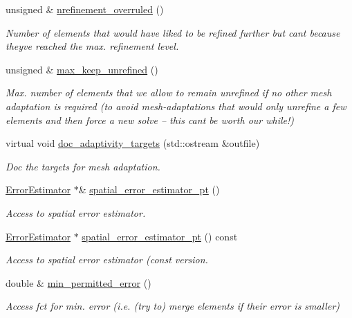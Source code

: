 \begin{DoxyCompactItemize}
unsigned \& \hyperlink{classoomph_1_1RefineableMeshBase_af189058782c7217f6d29a6f9555e7c3d}{nrefinement\+\_\+overruled} ()
\begin{DoxyCompactList}\small\item\em Number of elements that would have liked to be refined further but can\textquotesingle{}t because they\textquotesingle{}ve reached the max. refinement level. \end{DoxyCompactList}\item 
unsigned \& \hyperlink{classoomph_1_1RefineableMeshBase_a2216b4d0a8433a1975e6990a5e6533f7}{max\+\_\+keep\+\_\+unrefined} ()
\begin{DoxyCompactList}\small\item\em Max. number of elements that we allow to remain unrefined if no other mesh adaptation is required (to avoid mesh-\/adaptations that would only unrefine a few elements and then force a new solve -- this can\textquotesingle{}t be worth our while!) \end{DoxyCompactList}\item 
virtual void \hyperlink{classoomph_1_1RefineableMeshBase_a9f54bbde6fbfe2fef719c4d3fa5e0ae7}{doc\+\_\+adaptivity\+\_\+targets} (std\+::ostream \&outfile)
\begin{DoxyCompactList}\small\item\em Doc the targets for mesh adaptation. \end{DoxyCompactList}\item 
\hyperlink{classoomph_1_1ErrorEstimator}{Error\+Estimator} $\ast$\& \hyperlink{classoomph_1_1RefineableMeshBase_af8bb7a00156a9ddc54bdfccc988fd413}{spatial\+\_\+error\+\_\+estimator\+\_\+pt} ()
\begin{DoxyCompactList}\small\item\em Access to spatial error estimator. \end{DoxyCompactList}\item 
\hyperlink{classoomph_1_1ErrorEstimator}{Error\+Estimator} $\ast$ \hyperlink{classoomph_1_1RefineableMeshBase_a3acbda3faa159eaa9a2889af8a432175}{spatial\+\_\+error\+\_\+estimator\+\_\+pt} () const
\begin{DoxyCompactList}\small\item\em Access to spatial error estimator (const version. \end{DoxyCompactList}\item 
double \& \hyperlink{classoomph_1_1RefineableMeshBase_ad3a13bfaf687135d0154ce2f9b60edb7}{min\+\_\+permitted\+\_\+error} ()
\begin{DoxyCompactList}\small\item\em Access fct for min. error (i.\+e. (try to) merge elements if their error is smaller) \end{DoxyCompactList}\item 

\end{DoxyCompactItemize}
